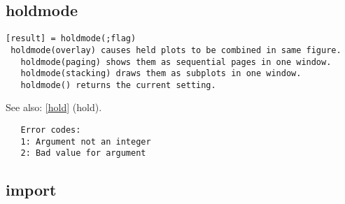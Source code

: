\documentclass[a4paper]{article}
\begin{document}
\subsection{holdmode\label{holdmode}}

\begin{tscreen}
\begin{verbatim}
[result] = holdmode(;flag)
 holdmode(overlay) causes held plots to be combined in same figure.
   holdmode(paging) shows them as sequential pages in one window.
   holdmode(stacking) draws them as subplots in one window.
   holdmode() returns the current setting.
\end{verbatim}

See also: \ref{hold} {(hold)}.
\begin{verbatim}
   Error codes:
   1: Argument not an integer
   2: Bad value for argument 
\end{verbatim}
\end{tscreen}





\subsection{import\label{import}}
\end{document}
